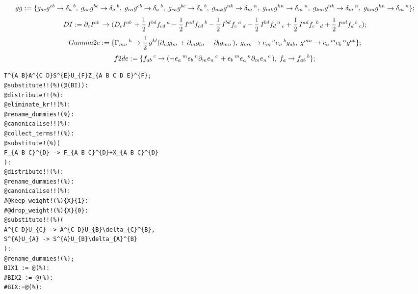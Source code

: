 \documentclass[11pt]{article}
\def\specialcolon{\mathrel{\mathop{:}}\hspace{-.5em}}
\begin{document}
\begin{dmath*}[compact, spread=2pt]
gg\specialcolon{}= \{{g}_{a c} {g}^{c b} \rightarrow {\delta}_{a}\,^{b},\; {g}_{a c} {g}^{b c} \rightarrow {\delta}_{a}\,^{b},\; {g}_{c a} {g}^{c b} \rightarrow {\delta}_{a}\,^{b},\; {g}_{c a} {g}^{b c} \rightarrow {\delta}_{a}\,^{b},\; {g}_{m k} {g}^{n k} \rightarrow {\delta}_{m}\,^{n},\; {g}_{m k} {g}^{k n} \rightarrow {\delta}_{m}\,^{n},\; {g}_{k m} {g}^{n k} \rightarrow {\delta}_{m}\,^{n},\; {g}_{k m} {g}^{k n} \rightarrow {\delta}_{m}\,^{n}\};
\end{dmath*}
\begin{dmath*}[compact, spread=2pt]
DI\specialcolon{}= {\partial}_{c}{{I}^{a b}}\,  \rightarrow ({D}_{c}{{I}^{a b}}\,  + \frac{1}{2}\, {I}^{b d} {f}_{c d}\,^{a} - \frac{1}{2}\, {I}^{a d} {f}_{c d}\,^{b} - \frac{1}{2}\, {I}^{b d} {f}_{c}\,^{a}\,_{d} - \frac{1}{2}\, {I}^{b d} {f}_{d}\,^{a}\,_{c} + \frac{1}{2}\, {I}^{a d} {f}_{c}\,^{b}\,_{d} + \frac{1}{2}\, {I}^{a d} {f}_{d}\,^{b}\,_{c});
\end{dmath*}
\begin{dmath*}[compact, spread=2pt]
Gamma2e\specialcolon{}= \{{\Gamma}_{m n}\,^{k} \rightarrow \frac{1}{2}\, {g}^{k l} ({\partial}_{n}{{g}_{l m}}\,  + {\partial}_{m}{{g}_{l n}}\,  - {\partial}_{l}{{g}_{m n}}\, ),\; {g}_{m n} \rightarrow {e}_{m}\,^{a} {e}_{n}\,^{b} {g}_{a b},\; {g}^{m n} \rightarrow {e}_{a}\,^{m} {e}_{b}\,^{n} {g}^{a b}\};
\end{dmath*}
\begin{dmath*}[compact, spread=2pt]
f2de\specialcolon{}= \{{f}_{a b}\,^{c} \rightarrow ( - {e}_{a}\,^{m} {e}_{b}\,^{n} {\partial}_{m}{{e}_{n}\,^{c}}\,  + {e}_{b}\,^{m} {e}_{a}\,^{n} {\partial}_{m}{{e}_{n}\,^{c}}\, ),\; {f}_{a} \rightarrow {f}_{a b}\,^{b}\};
\end{dmath*}
{\color[named]{Blue}\begin{verbatim}
T^{A B}A^{C D}S^{E}U_{F}Z_{A B C D E}^{F};
@substitute!!(%)(@(BI)):
@distribute!!(%):
@eliminate_kr!!(%):
@rename_dummies!(%):
@canonicalise!!(%):
@collect_terms!!(%):
@substitute!(%)(
F_{A B C}^{D} -> F_{A B C}^{D}+X_{A B C}^{D}
):
@distribute!!(%):
@rename_dummies!(%):
@canonicalise!!(%):
#@keep_weight!(%){X}{1}:
#@drop_weight!(%){X}{0}:
@substitute!!(%)(
A^{C D}U_{C} -> A^{C D}U_{B}\delta_{C}^{B},
S^{A}U_{A} -> S^{A}U_{B}\delta_{A}^{B}
):
@rename_dummies!(%);
BIX1 := @(%):
#BIX2 := @(%):
#BIX:=@(%):
\end{verbatim}}
\end{document}

